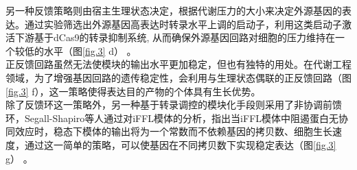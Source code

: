 \documentclass[b5paper,9pt,oneolumn,twoside,UTF8]{article}
\begin{document}
\indent 另一种反馈策略则由宿主生理状态决定，根据代谢压力的大小来决定外源基因的表达。通过实验筛选出外源基因高表达时转录水平上调的启动子，利用这类启动子激活下游基于dCas9的转录抑制系统, 从而确保外源基因回路对细胞的压力维持在一个较低的水平（图\ref{fig.3} d） \cite{ceroni2018burden}。\\
\indent 正反馈回路虽然无法使模块的输出水平更加稳定，但也有独特的用处。在代谢工程领域，为了增强基因回路的遗传稳定性，会利用与生理状态偶联的正反馈回路（图\ref{fig.3} f），这一策略使得表达目的产物的个体具有生长优势\cite{Rugbjerg2018, Xiao2016}。\\
\indent 除了反馈环这一策略外，另一种基于转录调控的模块化手段则采用了非协调前馈环，Segall-Shapiro等人通过对iFFL模体的分析，指出当iFFL模体中阻遏蛋白无协同效应时，稳态下模体的输出将为一个常数而不依赖基因的拷贝数、细胞生长速度，通过这一简单的策略，可以使基因在不同拷贝数下实现稳定表达（图\ref{fig.3} g） \cite{Segall-Shapiro2018}。
\end{document}
